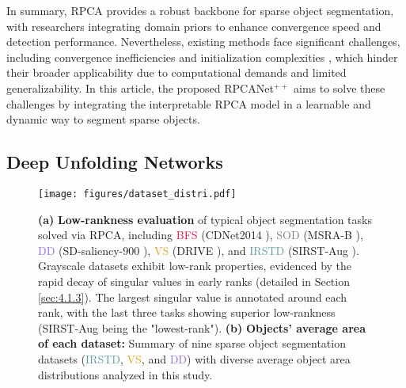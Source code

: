 \documentclass[10pt,journal,compsoc]{IEEEtran}
\begin{document}
In summary, RPCA provides a robust backbone for sparse object segmentation, with researchers integrating domain priors to enhance convergence speed and detection performance. Nevertheless, existing methods face significant challenges, including convergence inefficiencies and initialization complexities \cite{song-2020-MCITF}, which hinder their broader applicability due to computational demands and limited generalizability. In this article, the proposed RPCANet$^{++}$ aims to solve these challenges by integrating the interpretable RPCA model in a learnable and dynamic way to segment sparse objects.



\subsection{Deep Unfolding Networks}
\begin{figure}
\setlength{\abovecaptionskip}{0pt}
\setlength{\belowcaptionskip}{0pt}
    \centering
    \texttt{[image: figures/dataset\_distri.pdf]}
    \caption{\textbf{(a)} \textbf{Low-rankness evaluation} of typical object segmentation tasks solved via RPCA, including \textcolor{Crimson}{BFS} (CDNet2014 \cite{wang2014cdnet2014}), \textcolor{gray}{SOD} (MSRA-B \cite{jiang2013msrab}), \textcolor{MediumPurple}{DD} (SD-saliency-900 \cite{song-2020-MCITF}), \textcolor{Goldenrod}{VS} (DRIVE \cite{staal-2004-drive}), and \textcolor{CadetBlue}{IRSTD} (SIRST-Aug \cite{zhang-2023-agpc}). Grayscale datasets exhibit low-rank properties, evidenced by the rapid decay of singular values in early ranks (detailed in Section \ref{sec:4.1.3}). The largest singular value is annotated around each rank, with the last three tasks showing superior low-rankness (SIRST-Aug being the "lowest-rank"). \textbf{(b)} \textbf{Objects' average area of each dataset:} Summary of nine sparse object segmentation datasets (\textcolor{CadetBlue}{IRSTD}, \textcolor{Goldenrod}{VS}, and \textcolor{MediumPurple}{DD}) with diverse average object area distributions analyzed in this study.}
    \label{fig:dataset}
\vspace{-0.5cm}
\end{figure}
\end{document}

